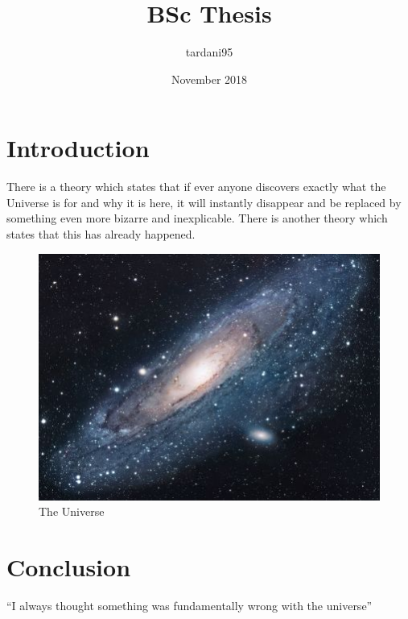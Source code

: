 \documentclass{article}
\title{BSc Thesis}
\author{tardani95 }
\date{November 2018}
\begin{document}
\maketitle

\section{Introduction}
There is a theory which states that if ever anyone discovers exactly what the Universe is for and why it is here, it will instantly disappear and be replaced by something even more bizarre and inexplicable.
There is another theory which states that this has already happened.

\begin{figure}[h!]
\centering
\includegraphics[scale=1.7]{universe}
\caption{The Universe}
\label{fig:universe}
\end{figure}

\section{Conclusion}
``I always thought something was fundamentally wrong with the universe'' \citep{adams1995hitchhiker}



\end{document}
